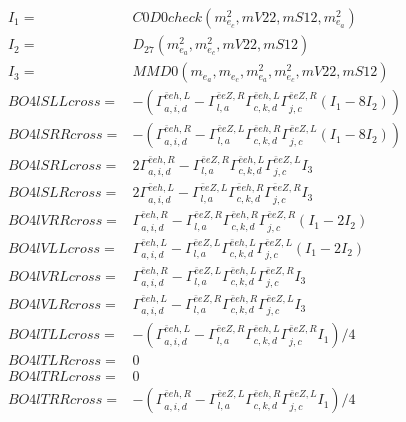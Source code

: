 \documentclass[A4,landscape]{article}
\begin{document}
\begin{align} 
I_1 = & C0D0check(m^2_{e_{{c}}}, mV22, mS12, m^2_{e_{{a}}}) \\ 
I_2 = & D_{27}(m^2_{e_{{a}}}, m^2_{e_{{c}}}, mV22, mS12) \\ 
I_3 = & MMD0(m_{e_{{a}}}, m_{e_{{c}}}, m^2_{e_{{a}}}, m^2_{e_{{c}}}, mV22, mS12) \\ 
  BO4lSLLcross= & -( \Gamma^{\bar{e}e h ,L}_{a, i, d} - \Gamma^{\bar{e}e Z ,R} _{l, a} \Gamma^{\bar{e}e h ,L}_{c, k, d} \Gamma^{\bar{e}e Z ,R}_{j, c} (I_1 - 8 I_2)) \\ 
  BO4lSRRcross= & -( \Gamma^{\bar{e}e h ,R}_{a, i, d} - \Gamma^{\bar{e}e Z ,L} _{l, a} \Gamma^{\bar{e}e h ,R}_{c, k, d} \Gamma^{\bar{e}e Z ,L}_{j, c} (I_1 - 8 I_2)) \\ 
  BO4lSRLcross= & 2  \Gamma^{\bar{e}e h ,R}_{a, i, d} - \Gamma^{\bar{e}e Z ,R} _{l, a} \Gamma^{\bar{e}e h ,L}_{c, k, d} \Gamma^{\bar{e}e Z ,L}_{j, c} I_3 \\ 
  BO4lSLRcross= & 2  \Gamma^{\bar{e}e h ,L}_{a, i, d} - \Gamma^{\bar{e}e Z ,L} _{l, a} \Gamma^{\bar{e}e h ,R}_{c, k, d} \Gamma^{\bar{e}e Z ,R}_{j, c} I_3 \\ 
  BO4lVRRcross= &  \Gamma^{\bar{e}e h ,R}_{a, i, d} - \Gamma^{\bar{e}e Z ,R} _{l, a} \Gamma^{\bar{e}e h ,R}_{c, k, d} \Gamma^{\bar{e}e Z ,R}_{j, c} (I_1 - 2 I_2) \\ 
  BO4lVLLcross= &  \Gamma^{\bar{e}e h ,L}_{a, i, d} - \Gamma^{\bar{e}e Z ,L} _{l, a} \Gamma^{\bar{e}e h ,L}_{c, k, d} \Gamma^{\bar{e}e Z ,L}_{j, c} (I_1 - 2 I_2) \\ 
  BO4lVRLcross= &  \Gamma^{\bar{e}e h ,R}_{a, i, d} - \Gamma^{\bar{e}e Z ,L} _{l, a} \Gamma^{\bar{e}e h ,L}_{c, k, d} \Gamma^{\bar{e}e Z ,R}_{j, c} I_3 \\ 
  BO4lVLRcross= &  \Gamma^{\bar{e}e h ,L}_{a, i, d} - \Gamma^{\bar{e}e Z ,R} _{l, a} \Gamma^{\bar{e}e h ,R}_{c, k, d} \Gamma^{\bar{e}e Z ,L}_{j, c} I_3 \\ 
  BO4lTLLcross= & -( \Gamma^{\bar{e}e h ,L}_{a, i, d} - \Gamma^{\bar{e}e Z ,R} _{l, a} \Gamma^{\bar{e}e h ,L}_{c, k, d} \Gamma^{\bar{e}e Z ,R}_{j, c} I_1)/4 \\ 
  BO4lTLRcross= & 0 \\ 
  BO4lTRLcross= & 0 \\ 
  BO4lTRRcross= & -( \Gamma^{\bar{e}e h ,R}_{a, i, d} - \Gamma^{\bar{e}e Z ,L} _{l, a} \Gamma^{\bar{e}e h ,R}_{c, k, d} \Gamma^{\bar{e}e Z ,L}_{j, c} I_1)/4 \\ 
\end{align} 
\end{document}
